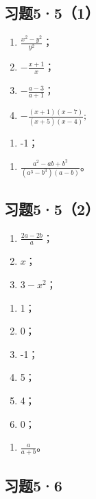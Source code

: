 \subsection{习题5·5（1）}

\begin{enumerate}[start=12]
\item
  \(\frac{x^2 - y^2}{y^2}\)；
\item
  \(-\frac{x + 1}{x}\)；
\item
  \(-\frac{a - 3}{a + 1}\)；
\item
  \(-\frac{(x+1)(x-7)}{(x+5)(x-4)};\)
\end{enumerate}

\begin{enumerate}[start=16]
\item
  -1；
\end{enumerate}

\begin{enumerate}[start=17]
\item
  \(\frac{a^2 - ab + b^2}{(a^3 - b^3)(a - b)}\)。
\end{enumerate}

\subsection{习题5·5（2）}

\begin{enumerate}[start=1]
\item
  \(\frac{2a - 2b}{a}\)；
\item
  \(x\)；
\item
  \(3 - x^{2}\)；
\end{enumerate}

\begin{enumerate}[start=4]
\item
  1；
\item
  0；
\item
  -1；
\item
  5；
\item
  4；
\item
  0；
\end{enumerate}

\begin{enumerate}[start=10]
\item
  \(\frac{a}{a + b}\)。
\end{enumerate}

\subsection{习题5·6}

